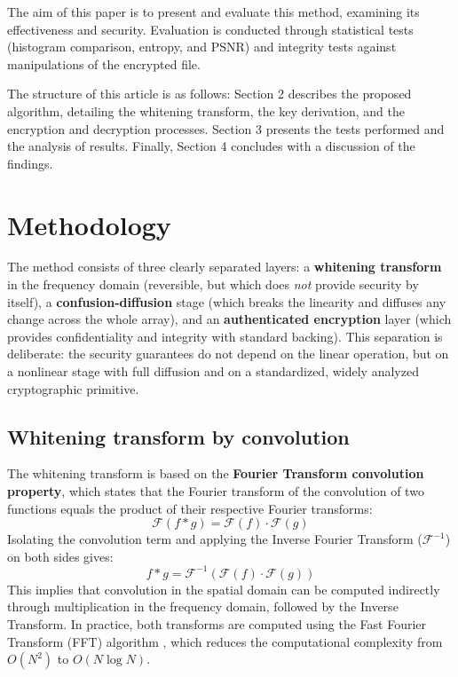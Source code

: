 \documentclass{llncs}
\begin{document}
The aim of this paper is to present and evaluate this method, examining its
effectiveness and security. Evaluation is conducted through statistical
tests (histogram comparison, entropy, and PSNR) and integrity tests against
manipulations of the encrypted file.

The structure of this article is as follows: Section 2 describes the
proposed algorithm, detailing the whitening transform, the key derivation,
and the encryption and decryption processes. Section 3 presents the tests
performed and the analysis of results. Finally, Section 4 concludes with a
discussion of the findings.

\section{Methodology}

The method consists of three clearly separated layers: a \textbf{whitening
transform} in the frequency domain (reversible, but which does \emph{not}
provide security by itself), a \textbf{confusion-diffusion} stage (which
breaks the linearity and diffuses any change across the whole array), and an
\textbf{authenticated encryption} layer (which provides confidentiality and
integrity with standard backing). This separation is deliberate: the
security guarantees do not depend on the linear operation, but on a
nonlinear stage with full diffusion and on a standardized, widely analyzed
cryptographic primitive.

\subsection{Whitening transform by convolution}

The whitening transform is based on the \textbf{Fourier Transform convolution
property}, which states that the Fourier transform of the convolution of two
functions equals the product of their respective Fourier transforms:
\[
\mathcal{F}(f * g) = \mathcal{F}(f) \cdot \mathcal{F}(g)
\]
Isolating the convolution term and applying the Inverse Fourier Transform
($\mathcal{F}^{-1}$) on both sides gives:
\[
f * g = \mathcal{F}^{-1}\left(\mathcal{F}(f) \cdot \mathcal{F}(g)\right)
\]
This implies that convolution in the spatial domain can be computed
indirectly through multiplication in the frequency domain, followed by the
Inverse Transform. In practice, both transforms are computed using the Fast
Fourier Transform (FFT) algorithm \cite{cooley}, which reduces the
computational complexity from $O(N^2)$ to $O(N\log N)$.
\end{document}

